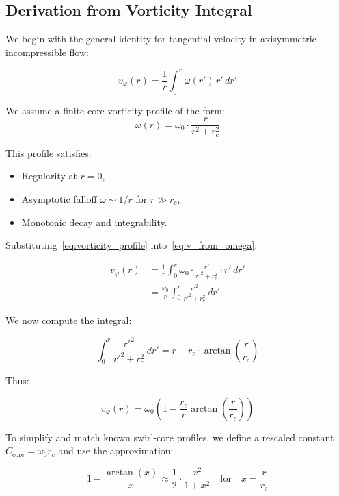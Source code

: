 \documentclass[12pt]{article}
\begin{document}
\subsection{Derivation from Vorticity Integral}

We begin with the general identity for tangential velocity in axisymmetric incompressible flow:

\begin{equation}
    v_\varphi(r) = \frac{1}{r} \int_0^r \omega(r') \, r' \, dr'
    \label{eq:v_from_omega}
\end{equation}

We assume a finite-core vorticity profile of the form:
\begin{equation}
    \omega(r) = \omega_0 \cdot \frac{r}{r^2 + r_c^2}
    \label{eq:vorticity_profile}
\end{equation}

This profile satisfies:
\begin{itemize}
    \item Regularity at \( r = 0 \),
    \item Asymptotic falloff \( \omega \sim 1/r \) for \( r \gg r_c \),
    \item Monotonic decay and integrability.
\end{itemize}

Substituting~\eqref{eq:vorticity_profile} into~\eqref{eq:v_from_omega}:

\begin{align}
    v_\varphi(r)
    &= \frac{1}{r} \int_0^r \omega_0 \cdot \frac{r'}{r'^2 + r_c^2} \cdot r' \, dr' \\
    &= \frac{\omega_0}{r} \int_0^r \frac{r'^2}{r'^2 + r_c^2} \, dr'
\end{align}

We now compute the integral:

\[
\int_0^r \frac{r'^2}{r'^2 + r_c^2} \, dr'
= r - r_c \cdot \arctan\left( \frac{r}{r_c} \right)
\]

Thus:

\begin{equation}
    v_\varphi(r)
    = \omega_0 \left( 1 - \frac{r_c}{r} \arctan\left( \frac{r}{r_c} \right) \right)
    \label{eq:velocity_arctan}
\end{equation}

To simplify and match known swirl-core profiles, we define a rescaled constant \( C_{\text{core}} = \omega_0 r_c \) and use the approximation:

\[
1 - \frac{\arctan(x)}{x} \approx \frac{1}{2} \cdot \frac{x^2}{1 + x^2}
\quad \text{for} \quad x = \frac{r}{r_c}
\]
\end{document}
